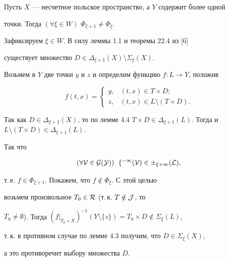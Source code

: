  


\begin{thms} 


Пусть $X$ --- несчетное польское пространство, а $Y$ содержит более одной 


точки. Тогда $(\forall \xi\in W)$ $\Phi_{\xi+1}\ne\Phi_\xi$. 


\end{thms} 


 


\begin{pf} 


Зафиксируем $\xi\in W$. В силу леммы 1.1 и теоремы 22.4 из [6] 


существует множество $D\in\Delta_{\xi+1}(X)\setminus \Sigma_\xi(X)$. 


Возьмем в $Y$ две точки $y$ и $z$ и определим функцию $f:L\to Y$, положив 


$$ 


f(t,x)= 


\begin{cases} 


y, & (t,x)\in T\times D;\\ 


z, & (t,x)\in L\setminus (T\times D). 


\end{cases} 


$$ 


Так как $D\in\Delta_{\xi+1}(X)$, то по лемме 4.4 $T\times D\in 


\Delta_{\xi+1}(L)$. Тогда и $L\setminus(T\times D)\in \Delta_{\xi+1}(L)$. 


Так что 


$$ 


(\forall \cal V\in\cal G(Y))\ \; f^{-1}(\cal V)\in 


\Sigma_{\xi+1}(L), 


$$ 


т.\,е. $f\in\Phi_{\xi+1}$. Покажем, что $f\notin\Phi_\xi$. С этой целью 


возьмем произвольное $T_0\in\cal R$ (т.\,к. $T\notin\cal J$, то 


$T_0\ne\emptyset$). Тогда $(f|_{T_0\times X})^{-1}(Y\setminus\{z\})= 


T_0\times D\notin\Sigma_\xi(L)$, 


т.\,к. в противном случае по лемме 4.3 получим, что $D\in\Sigma_\xi(X)$, 


а это противоречит выбору множества $D$. 


\end{pf} 


